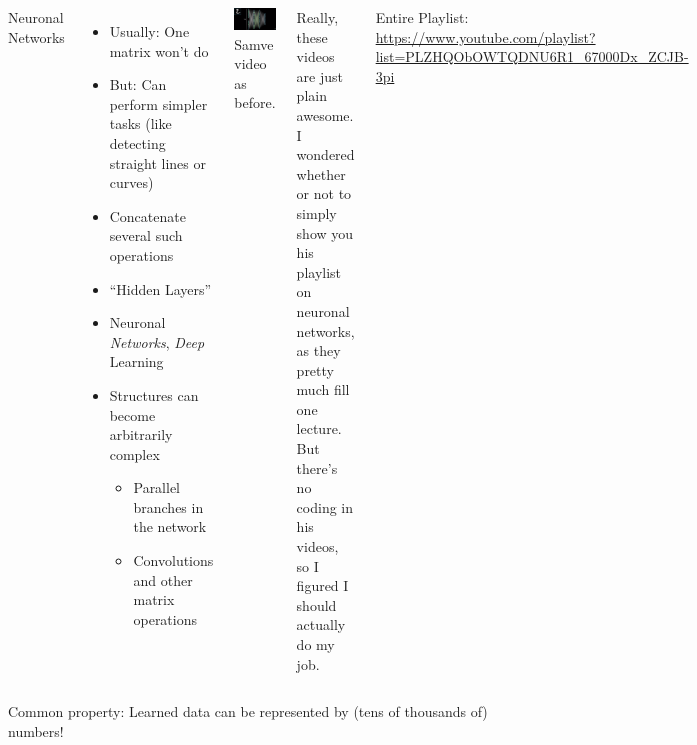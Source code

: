 \begin{frame}
%
\begin{columns}[T]
\begin{Large}
	{Neuronal Networks}
	\vspace{12pt}
\end{Large}
%
\begin{itemize}
\item Usually: One matrix won't do
\item But: Can perform simpler tasks (like detecting straight lines or curves)
\item Concatenate several such operations
\item[\Thus] \enquote{Hidden Layers}
\item[\Thus] Neuronal \emph{Networks}, \emph{Deep} Learning
\item Structures can become arbitrarily complex
	\begin{itemize}
	\item Parallel branches in the network
	\item Convolutions and other matrix operations
	\end{itemize}
\end{itemize}
%
	\includegraphics[width=\linewidth]{./gfx/3b1b-network}
	\scriptsize
	Samve video as before.
	
	\vspace{3pt}
	Really, these videos are just plain awesome. I wondered whether or not to simply show you his playlist on neuronal networks, as they pretty much fill one lecture.
	But there's no coding in his videos, so I figured I should actually do my job.
	
	\vspace{3pt}
	Entire Playlist:
	\url{https://www.youtube.com/playlist?list=PLZHQObOWTQDNU6R1_67000Dx_ZCJB-3pi}
\end{columns}
\vspace{6pt}
Common property: Learned data can be represented by (tens of thousands of) numbers!
%
\end{frame}


